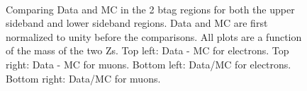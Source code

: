 \begin{figure}[htb!]
{\\
}
\caption{Comparing Data and MC in the 2 btag regions for both the upper sideband and lower sideband regions. Data and MC are first normalized to unity before the comparisons. All plots are a function of the mass of the two Zs. Top left: Data - MC for electrons.  Top right: Data - MC for muons.  Bottom left: Data/MC for electrons.  Bottom right: Data/MC for muons.
\label{fig:2tag_sideband_up_down}}  
\end{figure}






